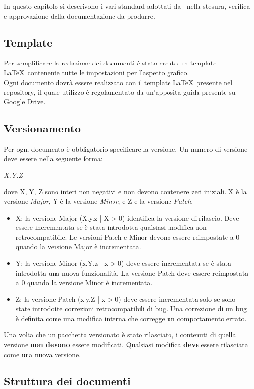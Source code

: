 In questo capitolo si descrivono i vari standard adottati da \GRUPPO\ nella stesura, verifica e approvazione della documentazione da produrre.
\subsection{Template}
Per semplificare la redazione dei documenti è stato creato un \gls{template} \LaTeX\ contenente tutte le impostazioni per l'aspetto grafico. \\
Ogni documento dovrà essere realizzato con il \gls{template} \LaTeX\ presente nel \gls{repository}, il quale utilizzo è regolamentato da un'apposita guida presente su \gls{Google Drive}.
\subsection{Versionamento}
Per ogni documento è obbligatorio specificare la versione. Un numero di versione deve essere nella seguente forma:
\begin{center}
	\emph{X.Y.Z}
\end{center}
dove X, Y, Z sono interi non negativi e non devono contenere zeri iniziali. X è la versione \textit{Major}, Y è la versione \textit{Minor}, e Z e la versione \textit{Patch}.
\begin{itemize}
	\item X: la versione Major (X.y.z | X > 0) identifica la versione di rilascio. Deve essere incrementata se è stata introdotta qualsiasi modifica non retrocompatibile. Le versioni Patch e Minor devono essere reimpostate a 0 quando la versione Major è incrementata. 
	\item Y: la versione Minor (x.Y.z | x > 0) deve essere incrementata se è stata introdotta una nuova funzionalità. La versione Patch deve essere reimpostata a 0 quando la versione Minor è incrementata.
	\item Z: la versione Patch (x.y.Z | x > 0) deve essere incrementata solo se sono state introdotte correzioni retrocompatibili di bug. Una correzione di un bug è definita come una modifica interna che corregge un comportamento errato.
\end{itemize}
Una volta che un pacchetto versionato è stato rilasciato, i contenuti di quella versione \textbf{non devono} essere modificati. Qualsiasi modifica \textbf{deve} essere rilasciata come una nuova versione.

\subsection{Struttura dei documenti}
